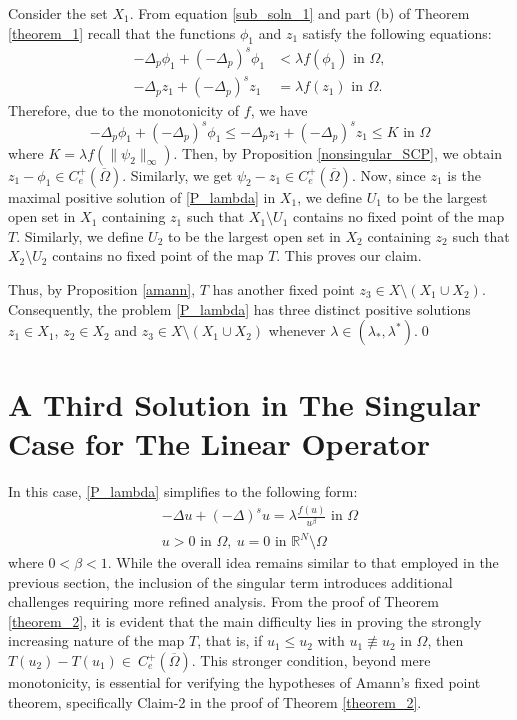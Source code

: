 \documentclass[reqno,oneside]{amsart}
\theoremstyle{definition}
\theoremstyle{remark}
\numberwithin{equation}{section}
\newcommand{\p}{\Delta_p}
\newcommand{\ps}{(-\Delta_p)^s}
\newcommand{\la} {\lambda}
\newcommand{\ba}{\beta}
\newcommand{\Om} {\Omega}
\newcommand{\omc}{(\overline{\Om})}
\newcommand{\bdry}{\mathbb{R}^N \setminus \Omega}
\newcommand{\De} {\Delta}
\begin{document}
Consider the set $X_1$. From equation \eqref{sub_soln_1} and part (b) of Theorem \ref{theorem_1} recall that the functions $\phi_1$ and $z_1$ satisfy the following equations:
\begin{equation*}
    \begin{aligned}
        -\p \phi_1 + \ps \phi_1 &< \la f(\phi_1) \text{ in } \Om,\\
        -\p z_1 + \ps z_1 &= \la f(z_1) \text{ in } \Om.
    \end{aligned}
\end{equation*}
Therefore, due to the monotonicity of $f$, we have
\[-\p \phi_1 + \ps \phi_1 \leq -\p z_1 + \ps z_1 \leq K \text{ in } \Om\]
where $K= \la f(\|\psi_2 \|_{\infty})$. Then, by Proposition \ref{nonsingular_SCP}, we obtain $z_1 - \phi_1 \in C_e^+ \omc$. Similarly, we get $\psi_2 - z_1 \in C_e^+ \omc$. Now, since $z_1$ is the maximal positive solution of \eqref{P_lambda} in $X_1$, we define $U_1$ to be the largest open set in $X_1$ containing $z_1$ such that $X_1 \setminus U_1$ contains no fixed point of the map $T$. Similarly, we define $U_2$ to be the largest open set in $X_2$ containing $z_2$ such that $X_2 \setminus U_2$ contains no fixed point of the map $T$. This proves our claim.

Thus, by Proposition \ref{amann}, $T$ has another fixed point $z_3 \in X \setminus (X_1 \cup X_2) $. Consequently, the problem \eqref{P_lambda} has three distinct positive solutions $z_1 \in X_1$, $z_2 \in X_2$ and $z_3 \in X \setminus (X_1 \cup X_2) $ whenever $\la\in (\la_* , \la^*)$.\hfill\qed


\section{A Third Solution in The Singular Case for The Linear Operator}\label{section-third solution- linear singular case}

In this case, \eqref{P_lambda} simplifies to the following form:
\begin{equation}\label{P_lambda_linear}
    \begin{aligned}
        -\Delta u + (-\De)^s u = \la \frac{f(u)}{u^{\ba}} \text{ in } \Om\\
        u >0 \text{ in } \Om,\ u =0 \text{ in } \bdry
    \end{aligned}
\end{equation}
where $0<\ba<1$. While the overall idea remains similar to that employed in the previous section, the inclusion of the singular term introduces additional challenges requiring more refined analysis. From the proof of Theorem \ref{theorem_2}, it is evident that the main difficulty lies in proving the strongly increasing nature of the map $T$, that is, if $u_1 \leq u_2$ with $u_1 \not\equiv u_2$ in $\Om$, then $T(u_2)- T(u_1) \in\ C_e^+ (\overline{\Om})$. This stronger condition, beyond mere monotonicity, is essential for verifying the hypotheses of Amann's fixed point theorem, specifically Claim-2 in the proof of Theorem \ref{theorem_2}.
\end{document}
